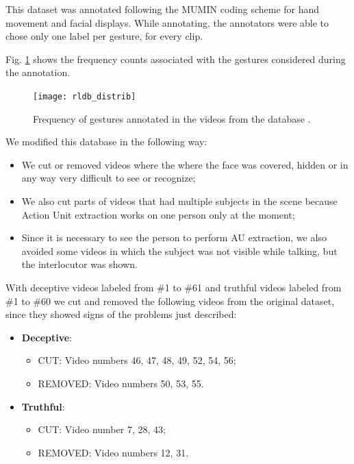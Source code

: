 This dataset was annotated following the MUMIN coding scheme for hand movement and facial displays. While annotating, the annotators were able to chose only one label per gesture, for every clip.

Fig. \ref{fig:rldb_distrib} shows the frequency counts associated with the gestures considered during the annotation.

\begin{figure}[H]
	\centering
	\texttt{[image: rldb\_distrib]}
	\caption{Frequency of gestures annotated in the videos from the database \cite{Perez-Rosas:2015:DDU:2818346.2820758}.}
	\label{fig:rldb_distrib}
\end{figure}

We modified this database in the following way:
\begin{itemize}
	\item We cut or removed videos where the where the face was covered, hidden or in  any way very difficult to see or recognize;
	\item We also cut parts of videos that had multiple subjects in the scene because Action Unit extraction works on one person only at the moment;
	\item Since it is necessary to see the person to perform AU extraction, we also avoided some videos in which the subject was not visible while talking, but the interlocutor was shown.
\end{itemize}

With deceptive videos labeled from \#1 to \#61 and truthful videos labeled from \#1 to \#60 we cut and removed the following videos from the original dataset, since they showed signs of the problems just described:

\begin{itemize}
	\item \textbf{Deceptive}:
	\begin{itemize}
		\item CUT: Video numbers 46, 47, 48, 49, 52, 54, 56;
		\item REMOVED: Video numbers 50, 53,  55.
	\end{itemize}
	\item \textbf{Truthful}:
	\begin{itemize}
		\item CUT: Video number 7, 28, 43;
		\item REMOVED: Video numbers 12, 31. 
	\end{itemize}
\end{itemize}


